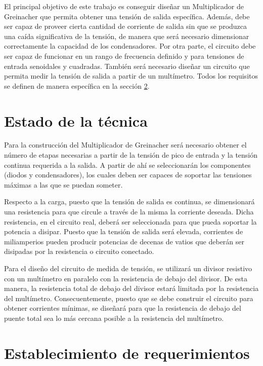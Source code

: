 El principal objetivo de este trabajo es conseguir diseñar un Multiplicador de Greinacher que permita obtener una tensión de salida específica.
Además, debe ser capaz de proveer cierta cantidad de corriente de salida sin que se produzca una caída significativa de la tensión, de manera que será
necesario dimensionar correctamente la capacidad de los condensadores. Por otra parte, el circuito debe ser capaz de funcionar en un rango de frecuencia definido
y para tensiones de entrada senoidales y cuadradas. También será necesario diseñar un circuito que permita medir la tensión de salida a partir de un multímetro.
Todos los requisitos se definen de manera específica en la sección \ref{requisitos}.

\section{Estado de la técnica}

Para la construcción del Multiplicador de Greinacher será necesario obtener el número de etapas necesarias a partir de la tensión de pico de entrada y
la tensión continua requerida a la salida. A partir de ahí se seleccionarán los componentes (diodos y condensadores), los cuales deben ser capaces de soportar las tensiones máximas
a las que se puedan someter.

Respecto a la carga, puesto que la tensión de salida es continua, se dimensionará una resistencia para que circule a través de la misma la corriente deseada.
Dicha resistencia, en el circuito real, deberá ser seleccionada para que pueda soportar la potencia a disipar. Puesto que la tensión de salida será elevada,
corrientes de miliamperios pueden producir potencias de decenas de vatios que deberán ser disipadas por la resistencia o circuito conectado.

Para el diseño del circuito de medida de tensión, se utilizará un divisor resistivo con un multímetro en paralelo con la resistencia de debajo del divisor.
De esta manera, la resistencia total de debajo del divisor estará limitada por la resistencia del multímetro. Consecuentemente, puesto
que se debe construir el circuito para obtener corrientes mínimas, se diseñará para que la resistencia de debajo del puente total sea lo más cercana posible a la
resistencia del multímetro.

\section{Establecimiento de requerimientos} \label{requisitos}

